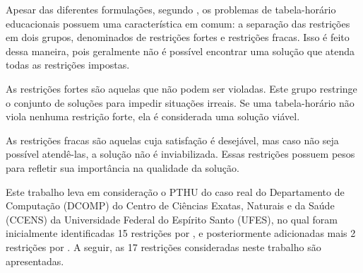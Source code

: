 Apesar das diferentes formulações, segundo , os problemas de tabela-horário educacionais possuem uma característica em comum: a separação das restrições em dois grupos, denominados de restrições fortes e restrições fracas. Isso é feito dessa maneira, pois geralmente não é possível encontrar uma solução que atenda todas as restrições impostas.

As restrições fortes são aquelas que não podem ser violadas. Este grupo restringe o conjunto de soluções para impedir situações irreais. Se uma tabela-horário não viola nenhuma restrição forte, ela é considerada uma solução viável.

As restrições fracas são aquelas cuja satisfação é desejável, mas caso não seja possível atendê-las, a solução não é inviabilizada. Essas restrições possuem pesos para refletir sua importância na qualidade da solução.

Este trabalho leva em consideração o PTHU do caso real do Departamento de Computação (DCOMP) do Centro de Ciências Exatas, Naturais e da Saúde (CCENS) da Universidade Federal do Espírito Santo (UFES), no qual foram inicialmente identificadas 15 restrições por , e posteriormente adicionadas mais 2 restrições por . A seguir, as 17 restrições consideradas neste trabalho são apresentadas.


